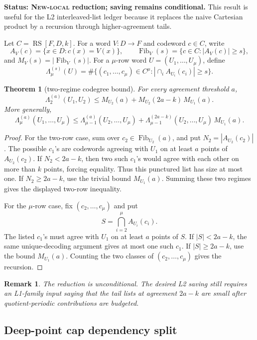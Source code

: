 \documentclass[11pt]{article}
\newtheorem{theorem}{Theorem}
\newtheorem{remark}{Remark}
\newcommand{\RS}{\operatorname{RS}}
\begin{document}
\textbf{Status: \textsc{New-local} reduction; saving remains conditional.}
This result is useful for the L2 interleaved-list ledger because it replaces
the naive Cartesian product by a recursion through higher-agreement tails.

Let \(C=\RS[F,D,k]\).  For a word \(V:D\to F\) and codeword \(c\in C\), write
\[
  A_V(c)=\{x\in D:c(x)=V(x)\},
  \qquad
  \operatorname{Fib}_V(s)=\{c\in C:|A_V(c)|\ge s\},
\]
and \(M_V(s)=|\operatorname{Fib}_V(s)|\).  For a \(\mu\)-row word
\(U=(U_1,\ldots,U_\mu)\), define
\[
  \Lambda_\mu^{(s)}(U)
  =
  \#\{(c_1,\ldots,c_\mu)\in C^\mu:
  |\cap_i A_{U_i}(c_i)|\ge s\}.
\]

\begin{theorem}[two-regime codegree bound]
\label{thm:l2-codegree}
For every agreement threshold \(a\),
\[
  \Lambda_2^{(a)}(U_1,U_2)
  \le
  M_{U_2}(a)+M_{U_2}(2a-k)\,M_{U_1}(a).
\]
More generally,
\[
  \Lambda_\mu^{(a)}(U_1,\ldots,U_\mu)
  \le
  \Lambda_{\mu-1}^{(a)}(U_2,\ldots,U_\mu)
  +
  \Lambda_{\mu-1}^{(2a-k)}(U_2,\ldots,U_\mu)\,M_{U_1}(a).
\]
\end{theorem}

\begin{proof}
For the two-row case, sum over \(c_2\in\operatorname{Fib}_{U_2}(a)\), and put
\(N_2=|A_{U_2}(c_2)|\).  The possible \(c_1\)'s are codewords agreeing with
\(U_1\) on at least \(a\) points of \(A_{U_2}(c_2)\).  If
\(N_2<2a-k\), then two such \(c_1\)'s would agree with each other on more than
\(k\) points, forcing equality.  Thus this punctured list has size at most
one.  If \(N_2\ge2a-k\), use the trivial bound \(M_{U_1}(a)\).  Summing these
two regimes gives the displayed two-row inequality.

For the \(\mu\)-row case, fix \((c_2,\ldots,c_\mu)\) and put
\[
  S=\bigcap_{i=2}^\mu A_{U_i}(c_i).
\]
The listed \(c_1\)'s must agree with \(U_1\) on at least \(a\) points of \(S\).
If \(|S|<2a-k\), the same unique-decoding argument gives at most one such
\(c_1\).  If \(|S|\ge2a-k\), use the bound \(M_{U_1}(a)\).  Counting the two
classes of \((c_2,\ldots,c_\mu)\) gives the recursion.
\end{proof}

\begin{remark}
The reduction is unconditional.  The desired L2 saving still requires an
L1-family input saying that the tail lists at agreement \(2a-k\) are small
after quotient-periodic contributions are budgeted.
\end{remark}

\subsection{Deep-point cap dependency split}
\end{document}
